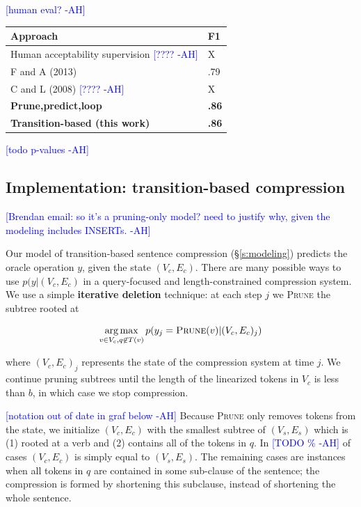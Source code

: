 \documentclass[11pt,a4paper]{article}
\newcommand{\ahcomment}[1]{\textcolor{blue}{[#1 -AH]}}
\DeclareMathOperator*{\argmaxA}{arg\,max} %
\begin{document}
\ahcomment{human eval?}
    
\begin{table}[htb!]
\begin{tabular}{ll}
\centering
Approach & F1  \\ \hline
Human acceptability supervision \ahcomment{????}        &  X        \\
F and A (2013)    & .79           \\
C and L (2008)  \ahcomment{????}  & X      \\
\textbf{Prune,predict,loop} &  \textbf{.86}    \\ 
\textbf{Transition-based (this work)} &  \textbf{.86}    \\   
\end{tabular}
\end{table}

\ahcomment{todo p-values}


\subsection{Implementation: transition-based compression}\label{s:transition}

\ahcomment{Brendan email: so it's a pruning-only model?  need to justify why, given the modeling includes INSERTs.} 

Our model of transition-based sentence compression (\S\ref{s:modeling}) predicts the oracle operation $y$, given the state $(V_c, E_c)$. There are many possible ways to use $p(y|(V_c, E_c)$ in a query-focused and length-constrained compression system. We use a simple \textbf{iterative deletion} technique: at each step $j$ we \textsc{Prune} the subtree rooted at 

$$\argmaxA_{v \in V_c,q\not\in T(v)}   p(y_j = \textsc{Prune}(v) | (V_c, E_c)_j)$$

\noindent where $(V_c, E_c)_j$ represents the state of the compression system at time $j$. We continue pruning subtrees until the length of the linearized tokens in $V_c$ is less than $b$, in which case we stop compression. 

\ahcomment{notation out of date in graf below}
Because \textsc{Prune} only removes tokens from the state, we initialize $(V_c, E_c)$ with the smallest subtree of $(V_s, E_s)$ which is (1) rooted at a verb and (2) contains all of the tokens in $q$. In \ahcomment{TODO \%} of cases $(V_c, E_c)$ is simply equal to $(V_s, E_s)$. The remaining cases are instances when all tokens in $q$ are contained in some sub-clause of the sentence; the compression is formed by shortening this subclause, instead of shortening the whole sentence.
\end{document}

